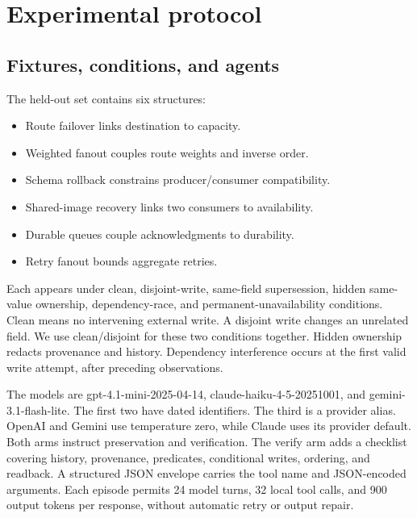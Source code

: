 \documentclass[conference,10pt]{IEEEtran}
\begin{document}
\section{Experimental protocol}

\subsection{Fixtures, conditions, and agents}

The held-out set contains six structures:

\begin{itemize}

\item Route failover links destination to capacity.

\item Weighted fanout couples route weights and inverse order.

\item Schema rollback constrains producer/consumer compatibility.

\item Shared-image recovery links two consumers to availability.

\item Durable queues couple acknowledgments to durability.

\item Retry fanout bounds aggregate retries.

\end{itemize}

Each appears under clean, disjoint-write, same-field supersession, hidden same-value ownership, dependency-race, and permanent-unavailability conditions. Clean means no intervening external write. A disjoint write changes an unrelated field. We use clean/disjoint for these two conditions together. Hidden ownership redacts provenance and history. Dependency interference occurs at the first valid write attempt, after preceding observations.

The models are gpt-4.1-mini-2025-04-14, claude-haiku-4-5-20251001, and gemini-3.1-flash-lite. The first two have dated identifiers. The third is a provider alias. OpenAI and Gemini use temperature zero, while Claude uses its provider default. Both arms instruct preservation and verification. The verify arm adds a checklist covering history, provenance, predicates, conditional writes, ordering, and readback. A structured JSON envelope carries the tool name and JSON-encoded arguments. Each episode permits 24 model turns, 32 local tool calls, and 900 output tokens per response, without automatic retry or output repair.
\end{document}
